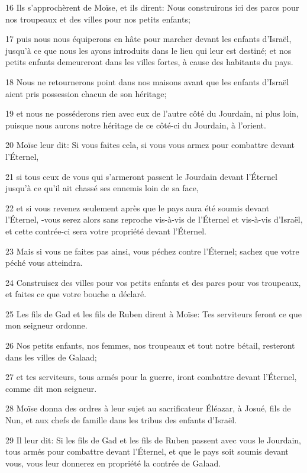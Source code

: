 \par 16 Ils s'approchèrent de Moïse, et ils dirent: Nous construirons ici des parcs pour nos troupeaux et des villes pour nos petits enfants;
\par 17 puis nous nous équiperons en hâte pour marcher devant les enfants d'Israël, jusqu'à ce que nous les ayons introduits dans le lieu qui leur est destiné; et nos petits enfants demeureront dans les villes fortes, à cause des habitants du pays.
\par 18 Nous ne retournerons point dans nos maisons avant que les enfants d'Israël aient pris possession chacun de son héritage;
\par 19 et nous ne posséderons rien avec eux de l'autre côté du Jourdain, ni plus loin, puisque nous aurons notre héritage de ce côté-ci du Jourdain, à l'orient.
\par 20 Moïse leur dit: Si vous faites cela, si vous vous armez pour combattre devant l'Éternel,
\par 21 si tous ceux de vous qui s'armeront passent le Jourdain devant l'Éternel jusqu'à ce qu'il ait chassé ses ennemis loin de sa face,
\par 22 et si vous revenez seulement après que le pays aura été soumis devant l'Éternel, -vous serez alors sans reproche vis-à-vis de l'Éternel et vis-à-vis d'Israël, et cette contrée-ci sera votre propriété devant l'Éternel.
\par 23 Mais si vous ne faites pas ainsi, vous péchez contre l'Éternel; sachez que votre péché vous atteindra.
\par 24 Construisez des villes pour vos petits enfants et des parcs pour vos troupeaux, et faites ce que votre bouche a déclaré.
\par 25 Les fils de Gad et les fils de Ruben dirent à Moïse: Tes serviteurs feront ce que mon seigneur ordonne.
\par 26 Nos petits enfants, nos femmes, nos troupeaux et tout notre bétail, resteront dans les villes de Galaad;
\par 27 et tes serviteurs, tous armés pour la guerre, iront combattre devant l'Éternel, comme dit mon seigneur.
\par 28 Moïse donna des ordres à leur sujet au sacrificateur Éléazar, à Josué, fils de Nun, et aux chefs de famille dans les tribus des enfants d'Israël.
\par 29 Il leur dit: Si les fils de Gad et les fils de Ruben passent avec vous le Jourdain, tous armés pour combattre devant l'Éternel, et que le pays soit soumis devant vous, vous leur donnerez en propriété la contrée de Galaad.
